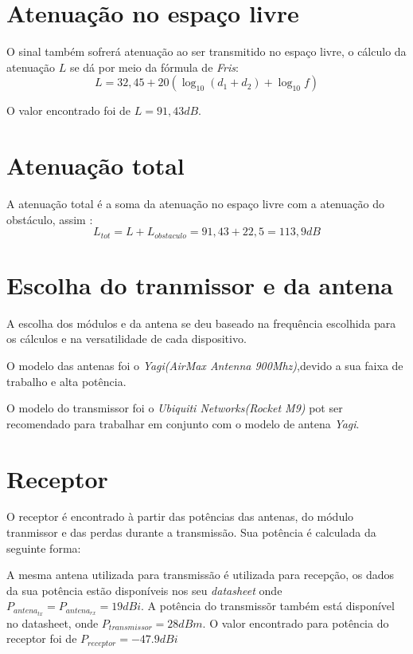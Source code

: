 \section{Atenuação no espaço livre}
O sinal também sofrerá atenuação ao ser transmitido no espaço livre, o cálculo da atenuação $L$ se dá por meio da fórmula de \textit{Fris}:
\begin{equation}
L = 32,45 +20(\log_{10}(d_1+d_2) + \log_{10}f)
\end{equation}

O valor encontrado foi de $L = 91,43dB$.

\section{Atenuação total}
A atenuação total é a soma da atenuação no espaço livre com a atenuação do obstáculo, assim :
\begin{equation}
L_{tot} = L + L_{obstaculo} = 91,43 + 22,5 = 113,9dB 
\end{equation}
\section{Escolha do tranmissor e da antena}
 A escolha dos módulos e da antena se deu baseado na frequência escolhida para os cálculos e na versatilidade de cada dispositivo. 
 
 O modelo das antenas foi o \textit{Yagi(AirMax Antenna 900Mhz)},devido a sua faixa de trabalho e alta potência.
 
 O modelo do transmissor foi o \textit{Ubiquiti Networks(Rocket M9)} pot ser recomendado para trabalhar em conjunto com o modelo de antena \textit{Yagi}. 
\section{Receptor}
O receptor é encontrado à partir das potências das antenas, do módulo tranmissor e das perdas durante a transmissão. Sua potência é calculada da seguinte forma:

A mesma antena utilizada para transmissão é utilizada para recepção, os dados da sua potência estão disponíveis nos seu \textit{datasheet} onde $P_{antena_{tx}} = P_{antena_{rx}} = 19dBi$. A potência do transmissõr também está disponível no datasheet, onde $P_{transmissor} = 28dBm$. O valor encontrado para potência do receptor foi de $	P_{receptor} = -47.9dBi$

